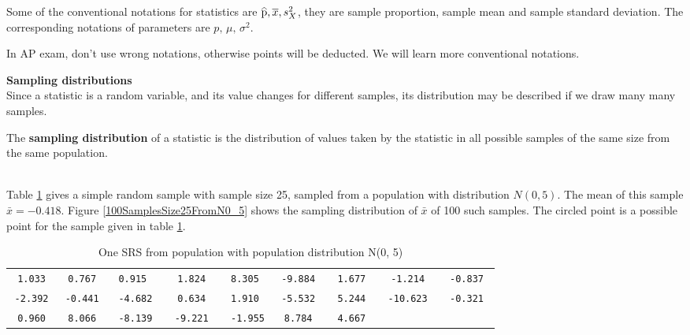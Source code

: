 \documentclass[a4paper, 12pt,twoside]{book}
\newcommand\reallywidehat[1]{%
\savestack{\tmpbox}{\stretchto{%
  \scaleto{%
    \scalerel*[\widthof{\ensuremath{#1}}]{\kern-.6pt\bigwedge\kern-.6pt}%
    {\rule[-\textheight/2]{1ex}{\textheight}}%
  }{\textheight}%
}{0.5ex}}%
\stackon[1pt]{#1}{\tmpbox}%
}
\begin{document}
Some of the conventional notations for statistics are $\reallywidehat{p}, \overline{x}, s_X^2$, they are sample proportion, sample mean and sample standard deviation. The corresponding notations of  parameters are $p,\, \mu, \, \sigma^2$.\vspace{0.6cm}\\
\colorbox{babypink}{\parbox{\textwidth}{
In AP exam, don't use wrong notations, otherwise points will be deducted. We will learn more conventional notations.
}}

\newpage

\noindent \textbf{Sampling distributions}\vspace{0.3cm}\\
Since a statistic is a random variable, and its value changes for different samples, its distribution may be described if we draw many many samples. \vspace{0.3cm}\\
\colorbox{babypink}{\parbox{\textwidth}{
The \textbf{sampling distribution}  of a statistic is the distribution of values taken by the statistic in all possible samples of the same size from the same population.
}}\vspace{0.6cm}\\
Table \ref{OneSampleSize25} gives a simple random sample with sample size 25, sampled from a population with distribution $N(0, 5)$. The mean of this sample $\bar{x} = -0.418$. Figure \ref{100SamplesSize25FromN0_5} shows the sampling distribution of $\bar{x}$ of 100 such samples. The circled point is a possible point for the sample given in table \ref{OneSampleSize25}.
   \begin{table}[H]
       \begin{tabular}{ccccccccc}
        \texttt{1.033}&\texttt{ 0.767 }&\texttt{0.915  }&\texttt{ 1.824 }&\texttt{ 8.305 }&\texttt{ -9.884 }&\texttt{ 1.677 }&\texttt{ -1.214 }&\texttt{ -0.837 }\\
      \texttt{-2.392}&\texttt{-0.441}  &\texttt{ -4.682  }&\texttt{ 0.634 }&\texttt{ 1.910 }&\texttt{ -5.532 }&\texttt{ 5.244 }&\texttt{ -10.623 }&\texttt{ -0.321 }\\
        \texttt{ 0.960 }&\texttt{ 8.066  }&\texttt{ -8.139 }&\texttt{ -9.221 }&\texttt{  -1.955}&\texttt{ 8.784  }&\texttt{ 4.667 }&&\\
       \end{tabular}
       \caption{One SRS from population with population distribution N(0, 5)}
       \label{OneSampleSize25}
   \end{table}
\end{document}
